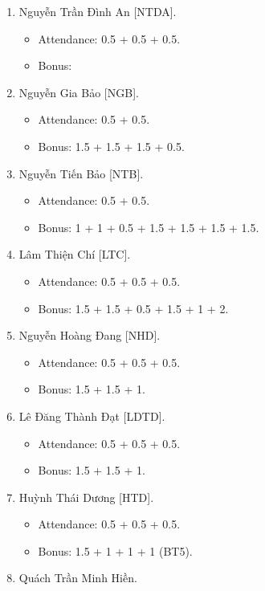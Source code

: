 \documentclass{article}
\begin{document}
\begin{enumerate}
    \item {\sc Nguyễn Trần Đình An [NTDA].}
    \begin{itemize}
        \item Attendance: 0.5 + 0.5 + 0.5.
        \item Bonus:
    \end{itemize}
    \item {\sc Nguyễn Gia Bảo [NGB].}
    \begin{itemize}
        \item Attendance: 0.5 + 0.5.
        \item Bonus: 1.5 + 1.5 + 1.5 + 0.5.
    \end{itemize}
    \item {\sc Nguyễn Tiến Bảo [NTB].}
    \begin{itemize}
        \item Attendance: 0.5 + 0.5.
        \item Bonus: 1 + 1 + 0.5 + 1.5 + 1.5 + 1.5 + 1.5.
    \end{itemize}
    \item {\sc Lâm Thiện Chí [LTC].}
    \begin{itemize}
        \item Attendance: 0.5 + 0.5 + 0.5.
        \item Bonus: 1.5 + 1.5 + 0.5 + 1.5 + 1 + 2.
    \end{itemize}
    \item {\sc Nguyễn Hoàng Đang [NHD].}
    \begin{itemize}
        \item Attendance: 0.5 + 0.5 + 0.5.
        \item Bonus: 1.5 + 1.5 + 1.
    \end{itemize}
    \item {\sc Lê Đăng Thành Đạt [LDTD].}
    \begin{itemize}
        \item Attendance: 0.5 + 0.5 + 0.5.
        \item Bonus: 1.5 + 1.5 + 1.
    \end{itemize}
    \item {\sc Huỳnh Thái Dương [HTD].}
    \begin{itemize}
        \item Attendance: 0.5 + 0.5 + 0.5.
        \item Bonus: 1.5 + 1 + 1 + 1 (BT5).
    \end{itemize}
    \item {\sc Quách Trần Minh Hiền.}

\end{enumerate}
\end{document}
